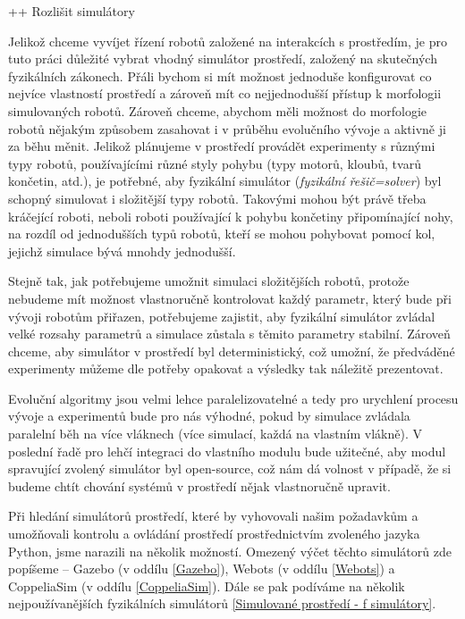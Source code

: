++ Rozlišit simulátory

Jelikož chceme vyvíjet řízení robotů založené na interakcích s prostředím, je
pro tuto práci důležité vybrat vhodný simulátor prostředí, založený na
skutečných fyzikálních zákonech. Přáli bychom si mít možnost jednoduše
konfigurovat co nejvíce vlastností prostředí a zároveň mít co nejjednodušší
přístup k morfologii simulovaných robotů. Zároveň chceme, abychom měli možnost
do morfologie robotů nějakým způsobem zasahovat i v průběhu evolučního vývoje a
aktivně ji za běhu měnit. Jelikož plánujeme v prostředí provádět experimenty s
různými typy robotů, používajícími různé styly pohybu (typy motorů, kloubů,
tvarů končetin, atd.), je potřebné, aby fyzikální simulátor (\emph{fyzikální
řešič=solver}) byl schopný simulovat i složitější typy robotů. Takovými mohou
být právě třeba kráčející roboti, neboli roboti používající k pohybu končetiny
připomínající nohy, na rozdíl od jednodušších typů robotů, kteří se mohou
pohybovat pomocí kol, jejichž simulace bývá mnohdy jednodušší. 

Stejně tak, jak potřebujeme umožnit simulaci složitějších robotů, protože
nebudeme mít možnost vlastnoručně kontrolovat každý parametr, který bude při
vývoji robotům přiřazen, potřebujeme zajistit, aby fyzikální simulátor zvládal
velké rozsahy parametrů a simulace zůstala s těmito parametry stabilní. Zároveň
chceme, aby simulátor v prostředí byl deterministický, což umožní, že
předváděné experimenty můžeme dle potřeby opakovat a výsledky tak náležitě
prezentovat. 

Evoluční algoritmy jsou velmi lehce paralelizovatelné a tedy pro
urychlení procesu vývoje a experimentů bude pro nás výhodné, pokud by simulace
zvládala paralelní běh na více vláknech (více simulací, každá na vlastním
vlákně). V poslední řadě pro lehčí integraci do vlastního modulu bude užitečné,
aby modul spravující zvolený simulátor byl open-source, což nám dá volnost v
případě, že si budeme chtít chování systémů v prostředí nějak vlastnoručně
upravit.

Při hledání simulátorů prostředí, které by vyhovovali našim požadavkům a
umožňovali kontrolu a ovládání prostředí prostřednictvím zvoleného jazyka
Python, jsme narazili na několik možností. Omezený výčet těchto simulátorů zde
popíšeme -- Gazebo (v oddílu \ref{Gazebo}), Webots (v oddílu \ref{Webots}) a
CoppeliaSim (v oddílu \ref{CoppeliaSim}). Dále se pak podíváme na několik
nejpoužívanějších fyzikálních simulátorů \ref{Simulované prostředí - f
simulátory}.

